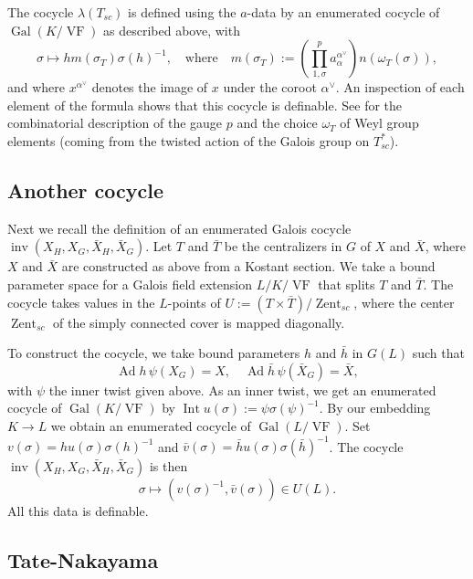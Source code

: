 \documentclass[12pt]{amsart}
\newcommand{\op}[1]{\operatorname{#1}}
\def\VF{{\op{VF}}}
\theoremstyle{plain}
\theoremstyle{definition}
\begin{document}
The cocycle $\lambda(T_{sc})$ is defined using the $a$-data by an enumerated
cocycle of $\op{Gal}(K/\VF)$ as described above, with
\[
\sigma \mapsto h m(\sigma_T) \sigma(h)^{-1},\quad \text{where}\quad
m(\sigma_T):= \left( \prod_{1,\sigma}^p a_\alpha^{\alpha^\vee}\right) n(\omega_T(\sigma)),
\]
and where $x^{\alpha^\vee}$ denotes the image of $x$ under the coroot
$\alpha^\vee$.  An inspection of each element of the formula shows
that this cocycle is definable.  See \cite{LSxf} for the combinatorial
description of the gauge $p$ and the choice $\omega_T$ of Weyl group
elements (coming from the twisted action of the Galois group on
$T^*_{sc}$).

\subsection{Another cocycle}

Next we recall the definition of an enumerated Galois cocycle
$\op{inv}(X_H,X_G,\bar X_H,\bar X_G)$.  Let $T$ and $\bar T$ be the
centralizers in $G$ of $X$ and $\bar X$, where $X$ and $\bar X$ are
constructed as above from a Kostant section.  We take a bound
parameter space for a Galois field extension $L/K/\VF$ that splits $T$
and $\bar T$.  The cocycle takes values in the $L$-points of $U:=
(T\times \bar T)/\op{Zent}_{sc}$, where the center $\op{Zent}_{sc}$ of the simply
connected cover is mapped diagonally.

To construct the cocycle, we take bound parameters $h$ and $\bar h$
 in $G(L)$ such that
\[
\op{Ad} h\,\psi(X_G)  = X,\quad \op{Ad} \bar h\, \psi(\bar X_G) = \bar X,
\]
with $\psi$ the inner twist given above.  As an inner twist, we get an
enumerated cocycle of $\op{Gal}(K/\VF)$ by $\op{Int} u(\sigma) := \psi
\sigma(\psi)^{-1}$.  By our embedding $K\to L$ we obtain an enumerated
cocycle of $\op{Gal}(L/\VF)$.  Set $v(\sigma) = h u(\sigma)
\sigma(h)^{-1}$ and $\bar v(\sigma) = \bar h u(\sigma) \sigma(\bar
h)^{-1}$. The cocycle $\op{inv}(X_H,X_G,\bar X_H,\bar X_G)$ is then
\[
\sigma \mapsto (v(\sigma)^{-1},\bar v(\sigma))\in U(L).
\]
All this data is definable.

\subsection{Tate-Nakayama}
\end{document}

